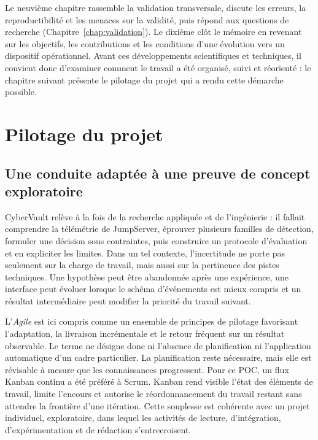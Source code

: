 \documentclass[11pt,a4paper,oneside]{report}
\theoremstyle{definition}
\theoremstyle{plain}
\begin{document}
Le neuvième chapitre rassemble la validation transversale, discute les erreurs,
la reproductibilité et les menaces sur la validité, puis répond aux questions
de recherche (Chapitre~\ref{chap:validation}). Le dixième clôt le mémoire en
revenant sur les objectifs, les contributions et les conditions d'une
évolution vers un dispositif opérationnel. Avant ces développements
scientifiques et techniques, il convient donc d'examiner comment le travail a
été organisé, suivi et réorienté : le chapitre suivant présente le pilotage du
projet qui a rendu cette démarche possible.

\chapter{Pilotage du projet}
\label{chap:management}

\section{Une conduite adaptée à une preuve de concept exploratoire}

CyberVault relève à la fois de la recherche appliquée et de l'ingénierie : il
fallait comprendre la télémétrie de JumpServer, éprouver plusieurs familles de
détection, formuler une décision sous contraintes, puis construire un protocole
d'évaluation et en expliciter les limites. Dans un tel contexte, l'incertitude
ne porte pas seulement sur la charge de travail, mais aussi sur la pertinence
des pistes techniques. Une hypothèse peut être abandonnée après une expérience,
une interface peut évoluer lorsque le schéma d'événements est mieux compris et
un résultat intermédiaire peut modifier la priorité du travail suivant.

L'\emph{Agile} est ici compris comme un ensemble de principes de pilotage
favorisant l'adaptation, la livraison incrémentale et le retour fréquent sur un
résultat observable. Le terme ne désigne donc ni l'absence de planification ni
l'application automatique d'un cadre particulier. La planification reste
nécessaire, mais elle est révisable à mesure que les connaissances progressent.
Pour ce POC, un flux Kanban continu a été préféré à Scrum. Kanban rend visible
l'état des éléments de travail, limite l'encours et autorise le réordonnancement
du travail restant sans attendre la frontière d'une itération. Cette souplesse
est cohérente avec un projet individuel, exploratoire, dans lequel les activités
de lecture, d'intégration, d'expérimentation et de rédaction s'entrecroisent.
\end{document}
